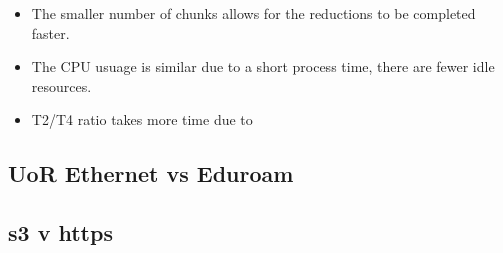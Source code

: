 \documentclass{article}
\begin{document}
\begin{itemize}
    \item The smaller number of chunks allows for the reductions to be completed faster.
    \item The CPU usuage is similar due to a short process time, there are fewer idle resources.
    \item T2/T4 ratio takes more time due to 
\end{itemize}


\subsection{UoR Ethernet vs Eduroam}






\subsection{s3 v https}
\end{document}
